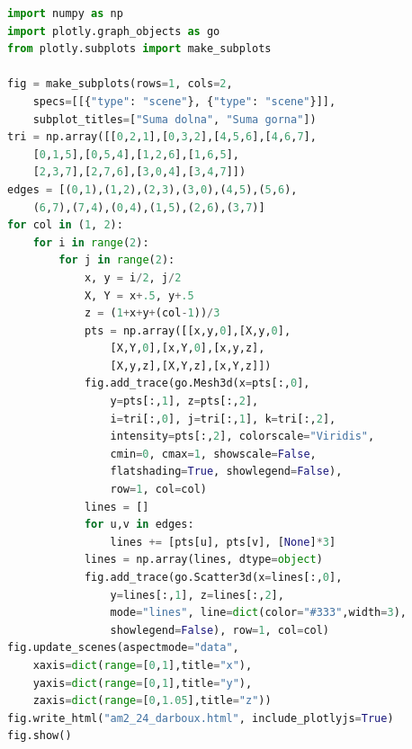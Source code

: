 \begin{lstlisting}[language=Python]
import numpy as np
import plotly.graph_objects as go
from plotly.subplots import make_subplots

fig = make_subplots(rows=1, cols=2,
    specs=[[{"type": "scene"}, {"type": "scene"}]],
    subplot_titles=["Suma dolna", "Suma gorna"])
tri = np.array([[0,2,1],[0,3,2],[4,5,6],[4,6,7],
    [0,1,5],[0,5,4],[1,2,6],[1,6,5],
    [2,3,7],[2,7,6],[3,0,4],[3,4,7]])
edges = [(0,1),(1,2),(2,3),(3,0),(4,5),(5,6),
    (6,7),(7,4),(0,4),(1,5),(2,6),(3,7)]
for col in (1, 2):
    for i in range(2):
        for j in range(2):
            x, y = i/2, j/2
            X, Y = x+.5, y+.5
            z = (1+x+y+(col-1))/3
            pts = np.array([[x,y,0],[X,y,0],
                [X,Y,0],[x,Y,0],[x,y,z],
                [X,y,z],[X,Y,z],[x,Y,z]])
            fig.add_trace(go.Mesh3d(x=pts[:,0],
                y=pts[:,1], z=pts[:,2],
                i=tri[:,0], j=tri[:,1], k=tri[:,2],
                intensity=pts[:,2], colorscale="Viridis",
                cmin=0, cmax=1, showscale=False,
                flatshading=True, showlegend=False),
                row=1, col=col)
            lines = []
            for u,v in edges:
                lines += [pts[u], pts[v], [None]*3]
            lines = np.array(lines, dtype=object)
            fig.add_trace(go.Scatter3d(x=lines[:,0],
                y=lines[:,1], z=lines[:,2],
                mode="lines", line=dict(color="#333",width=3),
                showlegend=False), row=1, col=col)
fig.update_scenes(aspectmode="data",
    xaxis=dict(range=[0,1],title="x"),
    yaxis=dict(range=[0,1],title="y"),
    zaxis=dict(range=[0,1.05],title="z"))
fig.write_html("am2_24_darboux.html", include_plotlyjs=True)
fig.show()
\end{lstlisting}

